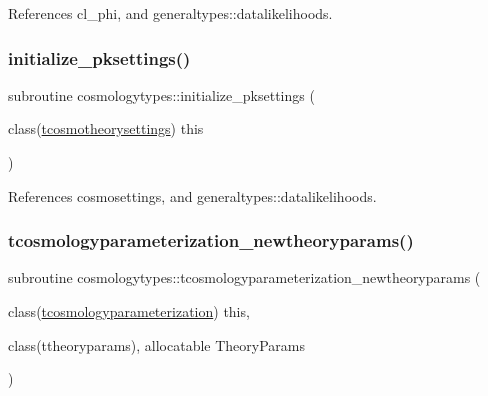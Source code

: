 References cl\+\_\+phi, and generaltypes\+::datalikelihoods.

\mbox{\label{namespacecosmologytypes_a8dba8960e99431585ae2fccadc339a2b}} 
\subsubsection{\texorpdfstring{initialize\+\_\+pksettings()}{initialize\_pksettings()}}
{\footnotesize\ttfamily subroutine cosmologytypes\+::initialize\+\_\+pksettings (\begin{DoxyParamCaption}\item[{class(\mbox{\hyperlink{structcosmologytypes_1_1tcosmotheorysettings}{tcosmotheorysettings}})}]{this }\end{DoxyParamCaption})}



References cosmosettings, and generaltypes\+::datalikelihoods.

\mbox{\label{namespacecosmologytypes_acc7e28ef33200bc007e793c27f93f5cd}} 
\subsubsection{\texorpdfstring{tcosmologyparameterization\+\_\+newtheoryparams()}{tcosmologyparameterization\_newtheoryparams()}}
{\footnotesize\ttfamily subroutine cosmologytypes\+::tcosmologyparameterization\+\_\+newtheoryparams (\begin{DoxyParamCaption}\item[{class(\mbox{\hyperlink{structcosmologytypes_1_1tcosmologyparameterization}{tcosmologyparameterization}})}]{this,  }\item[{class(ttheoryparams), allocatable}]{Theory\+Params }\end{DoxyParamCaption})}

\mbox{\label{namespacecosmologytypes_a4dba259c0331d9c0e16d42c55c758719}} 
